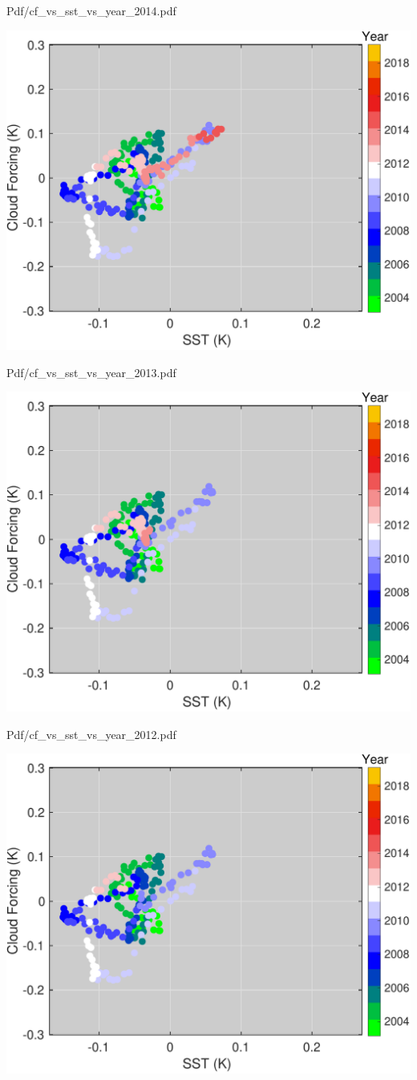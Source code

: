 \documentclass[presentation]{beamer}
\begin{document}
\begin{frame}[label={sec:orgc24c1df}]{Pdf/cf\_vs\_sst\_vs\_year\_2014.pdf}
\begin{center}
\includegraphics[width=0.7\linewidth]{./Figs/Pdf/cf_vs_sst_vs_year_2014.pdf}
\end{center}
\end{frame}

\begin{frame}[label={sec:orgd4bb1c1}]{Pdf/cf\_vs\_sst\_vs\_year\_2013.pdf}
\begin{center}
\includegraphics[width=0.7\linewidth]{./Figs/Pdf/cf_vs_sst_vs_year_2013.pdf}
\end{center}
\end{frame}

\begin{frame}[label={sec:orgabde611}]{Pdf/cf\_vs\_sst\_vs\_year\_2012.pdf}
\begin{center}
\includegraphics[width=0.7\linewidth]{./Figs/Pdf/cf_vs_sst_vs_year_2012.pdf}
\end{center}
\end{frame}
\end{document}
